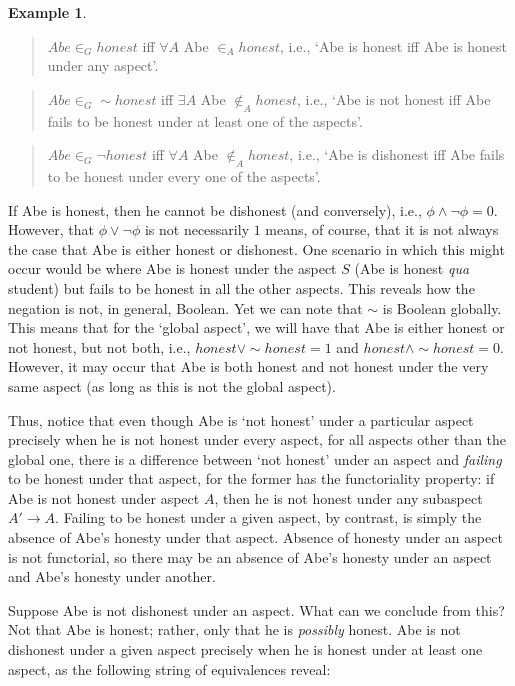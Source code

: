 \documentclass[11pt]{book}
\theoremstyle{definition}
\newtheorem{example}{Example}[section]
\theoremstyle{definition}
\theoremstyle{definition}
\theoremstyle{theorem}
\theoremstyle{definition}
\begin{document}
\begin{example}
	\begin{quote}
		$Abe \in_G honest$ iff $\forall A$ Abe $\in_A honest$, i.e., `Abe is honest iff Abe is honest under any aspect'. 
	\end{quote}
	\begin{quote}
		$Abe \in_G \sim honest$ iff $\exists A$ Abe $\notin_A honest$, i.e., `Abe is not honest iff Abe fails to be honest under at least one of the aspects'. 
	\end{quote}
	\begin{quote}
		$Abe \in_G \neg honest$ iff $\forall A$ Abe $\notin_A honest$, i.e., `Abe is dishonest iff Abe fails to be honest under every one of the aspects'. 
	\end{quote}
	If Abe is honest, then he cannot be dishonest (and conversely), i.e., $\phi \wedge \neg \phi = 0$. However, that $\phi \vee \neg \phi$ is not necessarily $1$ means, of course, that it is not always the case that Abe is either honest or dishonest. One scenario in which this might occur would be where Abe is honest under the aspect $S$ (Abe is honest \textit{qua} student) but fails to be honest in all the other aspects. This reveals how the negation is not, in general, Boolean. Yet we can note that $\sim$ is Boolean globally. This means that for the `global aspect', we will have that Abe is either honest or not honest, but not both, i.e., $honest \vee \sim honest = 1$ and $honest \wedge \sim honest = 0$. However, it may occur that Abe is both honest and not honest under the very same aspect (as long as this is not the global aspect).\par 
	Thus, notice that even though Abe is `not honest' under a particular aspect precisely when he is not honest under every aspect, for all aspects other than the global one, there is a difference between `not honest' under an aspect and \textit{failing} to be honest under that aspect, for the former has the functoriality property: if Abe is not honest under aspect $A$, then he is not honest under any subaspect $A' \rightarrow A$. Failing to be honest under a given aspect, by contrast, is simply the absence of Abe's honesty under that aspect. Absence of honesty under an aspect is not functorial, so there may be an absence of Abe's honesty under an aspect and Abe's honesty under another.  \par 
	Suppose Abe is not dishonest under an aspect. What can we conclude from this? Not that Abe is honest; rather, only that he is \textit{possibly} honest. Abe is not dishonest under a given aspect precisely when he is honest under at least one aspect, as the following string of equivalences reveal: 

\end{example}
\end{document}
